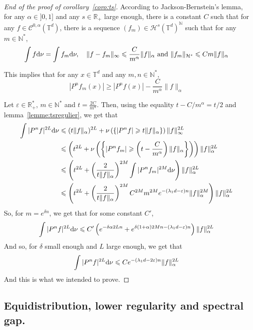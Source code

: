 \documentclass[11pt]{amsart}
\theoremstyle{definition}
\theoremstyle{remark}
\numberwithin{equation}{section}
\begin{document}
\begin{proof}[End of the proof of corollary~\ref{coro:ts}]
According to Jackson-Bernstein's lemma, for any $\alpha\in ]0,1]$ and any $s\in {\mathbb R}_+$ large enough, there is a constant $C$ such that for any $f\in \mathcal{ C}^{0,\alpha}({\mathbb T}^d)$, there is a sequence $(f_m)\in \mathcal{H}^s({\mathbb T}^d)^{\mathbb N}$ such that for any $m\in {\mathbb N}^\ast$,
\[
\int f{{\rm d}}\nu = \int f_m{{\rm d}}\nu, \quad \|f-f_m\|_\infty \leqslant \frac C{m^\alpha} \|f\|_\alpha \text{ and }\|f_m\|_{\mathcal{H}^s} \leqslant Cm\|f\|_\alpha
\] 

This implies that for any $x\in {\mathbb T}^d$ and any $m,n\in {\mathbb N}^\ast$,
\[
|P^n f_m(x)| \geqslant |P^n f (x)| - \frac C {m^\alpha} \|f\|_\alpha
\]

Let $\varepsilon \in {\mathbb R}_+^\ast$, $m\in {\mathbb N}^\ast$ and $t=\frac {2C}{m^\alpha}$. Then, using the equality $t-C/m^\alpha = t/2$ and lemma~\ref{lemme:tsregulier}, we get that
\begin{align*}
\int |P^n f|^{2L} {{\rm d}}\nu & \leqslant (t\|f\|_\alpha)^{2L} + \nu\left(\{ |P^n f|\geqslant t\|f\|_\alpha\}\right) \|f\|_\infty^{2L}\\
&\leqslant \left(t^{2L} + \nu\left(\left\{ |P^n f_m| \geqslant \left(t-\frac C {m^\alpha}\right) \|f\|_\alpha \right\}\right) \right) \|f\|_\alpha^{2L}\\
& \leqslant \left(t^{2L} + \left( \frac 2 {t\|f\|_\alpha} \right)^{2M} \int |P^n f_m|^{2M} {{\rm d}}\nu \right)\|f\|_\alpha^{2L} \\
& \leqslant  \left(t^{2L} + \left( \frac 2 {t\|f\|_\alpha} \right)^{2M} C^{2M} m^{2M} e^{-(\lambda_1 d -\varepsilon)n} \|f\|_\alpha^{2M}\right)\|f\|_\alpha^{2L}
\end{align*}
So, for $m=e^{\delta n}$, we get that for some constant $C'$,
\[
\int |P^n f|^{2L} {{\rm d}}\nu \leqslant C' \left(e^{-\delta \alpha 2L n} + e^{ \delta (1+\alpha)2M n -(\lambda_1 d - \varepsilon) n} \right)\|f\|_\alpha^{2L}
\]
And so, for $\delta$ small enough and $L$ large enough, we get that
\[
\int |P^n f|^{2L} {{\rm d}}\nu \leqslant C e^{-(\lambda_1 d-2\varepsilon)n} \|f\|_\alpha^{2L}
\]
And this is what we intended to prove.
\end{proof}

\subsection{Equidistribution, lower regularity and spectral gap.}
\end{document}
